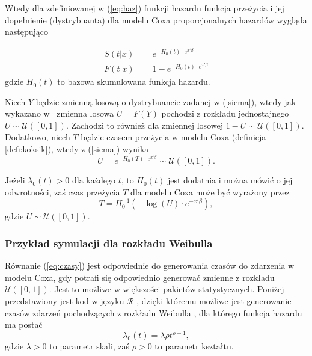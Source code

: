 Wtedy dla zdefiniowanej w (\ref{eq:haz}) funkcji hazardu funkcja przeżycia i jej dopełnienie (dystrybuanta) dla modelu Coxa proporcjonalnych hazardów wygląda następująco

\begin{align}
S(t|x)= & e^{-H_0(t)\cdot e^{x'\beta}} \\ 
F(t|x) = & 1 - e^{-H_0(t)\cdot e^{x'\beta}}\label{siema}
\end{align}
gdzie $H_0(t)$ to bazowa skumulowana funkcja hazardu.

Niech $Y$ będzie zmienną losową o dystrybuancie zadanej w (\ref{siema}), wtedy jak wykazano w~\cite{MOOD} zmienna losowa $U=F(Y)$ pochodzi z rozkładu jednostajnego $U \sim \mathcal{U}([0,1])$. Zachodzi to również dla zmiennej losowej $1-U \sim \mathcal{U}([0,1])$. Dodatkowo, niech $T$ będzie czasem przeżycia w modelu Coxa (definicja \ref{defi:koksik}), wtedy z (\ref{siema}) wynika
\begin{equation}
U = e^{-H_0(T)\cdot e^{x'\beta}} \sim \mathcal{U}([0,1]).
\end{equation}

Jeżeli $\lambda_0(t) >0$ dla każdego $t$, to $H_0(t)$ jest dodatnia i można mówić o jej odwrotności, zaś czas przeżycia $T$ dla modelu Coxa może być wyrażony przez 
\begin{equation}\label{eq:czasy}
T = H_0^{-1}(-\log(U)\cdot e^{-x'\beta}),
\end{equation}
gdzie  $U \sim \mathcal{U}([0,1])$.

\subsubsection{Przykład symulacji dla rozkładu Weibulla}\label{symWei}

Równanie (\ref{eq:czasy})  jest odpowiednie do generowania czasów do zdarzenia w modelu Coxa, gdy potrafi się odpowiednio generować zmienne z rozkładu $\mathcal{U}([0,1])$. Jest to możliwe w większości pakietów statystycznych. Poniżej przedstawiony jest kod w języku $\mathcal{R}$ \cite{programikr}, dzięki któremu możliwe jest generowanie czasów zdarzeń pochodzących z rozkładu Weibulla \cite{collett}, dla którego funkcja hazardu ma postać
\begin{equation}
\lambda_0(t)=\lambda\rho t^{\rho-1},
\end{equation}
gdzie $\lambda>0$ to parametr skali, zaś $\rho > 0$ to parametr kształtu.

\newpage

